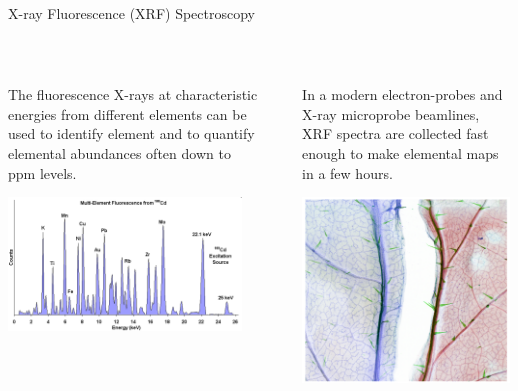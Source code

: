 \begin{slide} {X-ray Fluorescence (XRF) Spectroscopy}

  \begin{cenpage}{140mm}

    {\ }

    \begin{columns}[T]
    
      \begin{column}{68mm}
        
        The fluorescence X-rays at characteristic energies from different
        elements can be used to identify element and to quantify elemental
        abundances often down to ppm levels.

      \vmm\vmm
      
      \includegraphics[width=62mm]{figs/images/XRF_Spectrum}

      \vmm \vfill

      \vspace{27mm}
      \vfill
      
    \end{column}

      \begin{column}{2mm}    
      \end{column}
    
    \begin{column}{69mm}            

      In a modern electron-probes and X-ray microprobe beamlines, XRF
      spectra are collected fast enough to make elemental maps in a few hours.

      \vmm
      
      \hspace{3mm} \includegraphics[width=55mm]{figs/images/XRF_Map1}


\end{column}
\end{columns}
\end{cenpage}
\end{slide}
